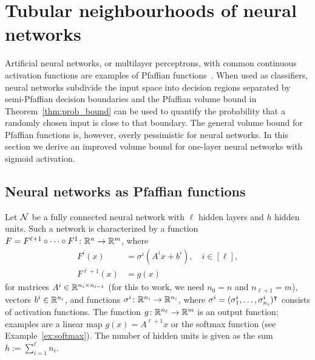 \section{Tubular neighbourhoods of neural networks}\label{sec:tubular-neural}
Artificial neural networks, or multilayer perceptrons, with common continuous activation functions are examples of Pfaffian functions~\cite{karpinski1997polynomial, bianchini2014complexity}. When used as classifiers, neural networks
subdivide the input space into decision regions separated by semi-Pfaffian decision boundaries and the Pfaffian volume bound in Theorem~\ref{thm:prob_bound} can be used to quantify the probability that a randomly chosen input is close to that boundary. 
The general volume bound for Pfaffian functions is, however, overly pessimistic for neural networks. In this section we derive an improved volume bound for one-layer neural networks with sigmoid activation.

\subsection{Neural networks as Pfaffian functions}
 Let $\mathcal{N}$ be a fully connected neural network with $\ell$ hidden layers and $h$ hidden units. Such a network is characterized by a function $F=F^{\ell+1}\circ \cdots \circ F^1\colon \mathbb{R}^n\to \mathbb{R}^m$, where
\begin{align*}
  F^{i}(x) &= \sigma^{i}(A^{i}x+b^{i}), \quad i\in [\ell],\\
  F^{\ell+1}(x) &= g(x)
\end{align*}
for matrices $A^{i} \in \mathbb{R}^{n_{i} \times n_{i-1}}$ (for this to work, we need $n_0 = n$ and $n_{\ell + 1} = m$), vectors $b^{i} \in \mathbb{R}^{n_i}$, and functions $\sigma^i\colon \mathbb{R}^{n_i}\to \mathbb{R}^{n_i}$, where $\sigma^i=(\sigma^i_1,\dots,\sigma^i_{n_i})^{\intercal}$ consists of activation functions. 
The function $g\colon \mathbb{R}^{n_\ell}\to \mathbb{R}^m$ is an output function; examples are a linear map $g(x)=A^{\ell+1}x$ or the softmax function (see Example~\ref{ex:softmax}). The number of hidden units is given as the sum $h:=\sum_{i=1}^{\ell} n_i$. 

